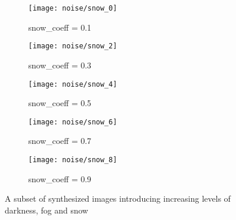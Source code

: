 \begin{figure}[H]\ContinuedFloat
	\centering
	\begin{subfigure}[b]{0.18\textwidth}
		\centering
		\texttt{[image: noise/snow\_0]}
		\caption{snow\_coeff = 0.1}
		\label{mcdo_fn2}
	\end{subfigure}
	\hfill
	\begin{subfigure}[b]{0.18\textwidth}
		\centering
		\texttt{[image: noise/snow\_2]}
		\caption{snow\_coeff = 0.3}
		\label{der_fn2}
	\end{subfigure}
	\hfill
	\begin{subfigure}[b]{0.18\textwidth}
		\centering
		\texttt{[image: noise/snow\_4]}
		\caption{snow\_coeff = 0.5}
		\label{homo_fn3}
	\end{subfigure}
	\hfill
	\begin{subfigure}[b]{0.18\textwidth}
		\centering
		\texttt{[image: noise/snow\_6]}
		\caption{snow\_coeff = 0.7}
		\label{hetero_fn3}
	\end{subfigure}
	\hfill
	\begin{subfigure}[b]{0.18\textwidth}
		\centering
		\texttt{[image: noise/snow\_8]}
		\caption{snow\_coeff = 0.9}
		\label{mcdo_fn3}
	\end{subfigure}
	\hfill
	\caption{A subset of synthesized images introducing increasing levels of darkness, fog and snow}
	\label{fig_noise_fog}
\end{figure}
